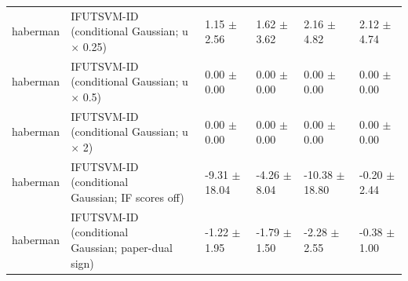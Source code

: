 \begin{table}[!t]
{\begin{tabular}{llllll}
haberman & \shortstack[l]{IFUTSVM-ID (conditional\\Gaussian; u \(\times\) 0.25)} & 1.15 \(\pm\) 2.56 & 1.62 \(\pm\) 3.62 & 2.16 \(\pm\) 4.82 & 2.12 \(\pm\) 4.74 \\
haberman & \shortstack[l]{IFUTSVM-ID (conditional\\Gaussian; u \(\times\) 0.5)} & 0.00 \(\pm\) 0.00 & 0.00 \(\pm\) 0.00 & 0.00 \(\pm\) 0.00 & 0.00 \(\pm\) 0.00 \\
haberman & \shortstack[l]{IFUTSVM-ID (conditional\\Gaussian; u \(\times\) 2)} & 0.00 \(\pm\) 0.00 & 0.00 \(\pm\) 0.00 & 0.00 \(\pm\) 0.00 & 0.00 \(\pm\) 0.00 \\
haberman & \shortstack[l]{IFUTSVM-ID (conditional\\Gaussian; IF scores off)} & -9.31 \(\pm\) 18.04 & -4.26 \(\pm\) 8.04 & -10.38 \(\pm\) 18.80 & -0.20 \(\pm\) 2.44 \\
haberman & \shortstack[l]{IFUTSVM-ID (conditional\\Gaussian; paper-dual\\sign)} & -1.22 \(\pm\) 1.95 & -1.79 \(\pm\) 1.50 & -2.28 \(\pm\) 2.55 & -0.38 \(\pm\) 1.00 \\
\hline
\end{tabular}%
}
\end{table}

